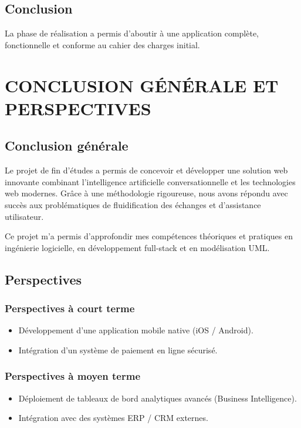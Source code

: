 \documentclass[12pt, a4paper, oneside]{report}
\begin{document}
\section{Conclusion}
La phase de réalisation a permis d'aboutir à une application complète, fonctionnelle et conforme au cahier des charges initial.

\chapter{CONCLUSION GÉNÉRALE ET PERSPECTIVES}

\section{Conclusion générale}
Le projet de fin d'études a permis de concevoir et développer une solution web innovante combinant l'intelligence artificielle conversationnelle et les technologies web modernes. Grâce à une méthodologie rigoureuse, nous avons répondu avec succès aux problématiques de fluidification des échanges et d'assistance utilisateur.

Ce projet m'a permis d'approfondir mes compétences théoriques et pratiques en ingénierie logicielle, en développement full-stack et en modélisation UML.

\section{Perspectives}

\subsection{Perspectives à court terme}
\begin{itemize}
  \item Développement d'une application mobile native (iOS / Android).
  \item Intégration d'un système de paiement en ligne sécurisé.
\end{itemize}

\subsection{Perspectives à moyen terme}
\begin{itemize}
  \item Déploiement de tableaux de bord analytiques avancés (Business Intelligence).
  \item Intégration avec des systèmes ERP / CRM externes.
\end{itemize}
\end{document}
